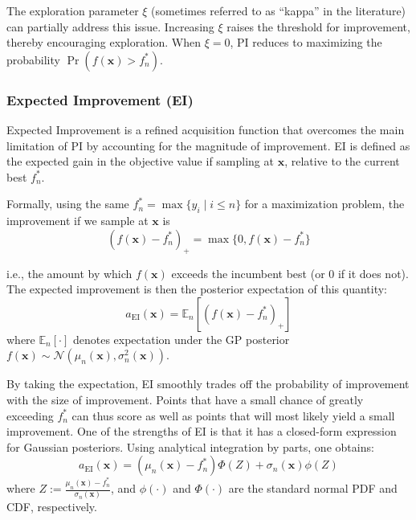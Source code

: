 \documentclass{ut-thesis}
\begin{document}
The exploration parameter $\xi$ (sometimes referred to as ``kappa'' in the literature) can partially address this issue. Increasing $\xi$ raises the threshold for improvement, thereby encouraging exploration. When $\xi = 0$, PI reduces to maximizing the probability $\Pr(f(\mathbf{x}) > f_n^*)$.

\subsubsection{Expected Improvement (EI)}
Expected Improvement is a refined acquisition function that overcomes the main limitation of PI by accounting for the magnitude of improvement. EI is defined as the expected gain in the objective value if sampling at $\mathbf{x}$, relative to the current best $f^*_n$\cite{mockus1975bayesian}\cite{mockus1989bayesian}. 

Formally, using the same $f^*_n = \max\{y_i \mid i \le n\}$ for a maximization problem, the improvement if we sample at $\mathbf{x}$ is 
\begin{equation}
    (f(\mathbf{x}) - f^*_n)_+ = \max\{0, f(\mathbf{x}) - f^*_n\}
\end{equation}

i.e., the amount by which $f(\mathbf{x})$ exceeds the incumbent best (or 0 if it does not). The expected improvement is then the posterior expectation of this quantity:
\begin{equation}
    a_{\mathrm{EI}}(\mathbf{x}) = \mathbb{E}_n\left[(f(\mathbf{x}) - f^*_n)_+\right]
\end{equation}
where $\mathbb{E}_n[\cdot]$ denotes expectation under the GP posterior $f(\mathbf{x}) \sim \mathcal{N}(\mu_n(\mathbf{x}), \sigma_n^2(\mathbf{x}))$. 

By taking the expectation, EI smoothly trades off the probability of improvement with the size of improvement. Points that have a small chance of greatly exceeding $f^*_n$ can thus score as well as points that will most likely yield a small improvement. One of the strengths of EI is that it has a closed-form expression for Gaussian posteriors. Using analytical integration by parts, one obtains:
\begin{equation}
    a_{\mathrm{EI}}(\mathbf{x}) = (\mu_n(\mathbf{x}) - f^*_n)\Phi(Z) + \sigma_n(\mathbf{x})\phi(Z)
\end{equation}
where $Z := \frac{\mu_n(\mathbf{\mathbf{x}}) - f^*_n}{\sigma_n(\mathbf{\mathbf{x}})}$, and $\phi(\cdot)$ and $\Phi(\cdot)$ are the standard normal PDF and CDF, respectively.
\end{document}
